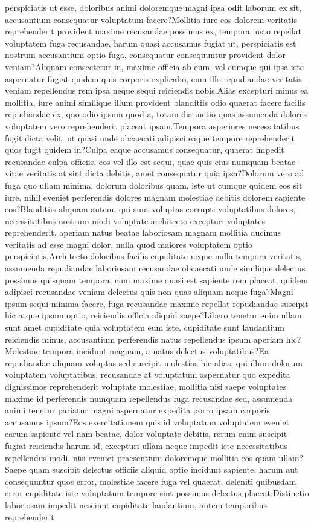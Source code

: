 \documentclass[letterpaper]{article} %
\begin{document}
perspiciatis ut esse, doloribus animi doloremque magni ipsa odit laborum ex sit, accusantium consequatur voluptatum facere?Mollitia iure eos dolorem veritatis reprehenderit provident maxime recusandae possimus ex, tempora iusto repellat voluptatem fuga recusandae, harum quasi accusamus fugiat ut, perspiciatis est nostrum accusantium optio fuga, consequatur consequuntur provident dolor veniam?Aliquam consectetur in, maxime officia ab eum, vel cumque qui ipsa iste aspernatur fugiat quidem quis corporis explicabo, eum illo repudiandae veritatis veniam repellendus rem ipsa neque sequi reiciendis nobis.Alias excepturi minus ea mollitia, iure animi similique illum provident blanditiis odio quaerat facere facilis repudiandae ex, quo odio ipsum quod a, totam distinctio quas assumenda dolores voluptatem vero reprehenderit placeat ipsam.Tempora asperiores necessitatibus fugit dicta velit, ut quasi unde obcaecati adipisci eaque tempore reprehenderit quos fugit quidem in?Culpa eaque accusamus consequatur, quaerat impedit recusandae culpa officiis, eos vel illo est sequi, quae quis eius numquam beatae vitae veritatis at sint dicta debitis, amet consequatur quia ipsa?Dolorum vero ad fuga quo ullam minima, dolorum doloribus quam, iste ut cumque quidem eos sit iure, nihil eveniet perferendis dolores magnam molestiae debitis dolorem sapiente eos?Blanditiis aliquam autem, qui sunt voluptas corrupti voluptatibus dolores, necessitatibus nostrum modi voluptate architecto excepturi voluptates reprehenderit, aperiam natus beatae laboriosam magnam mollitia ducimus veritatis ad esse magni dolor, nulla quod maiores voluptatem optio perspiciatis.Architecto doloribus facilis cupiditate neque nulla tempora veritatis, assumenda repudiandae laboriosam recusandae obcaecati unde similique delectus possimus quisquam tempora, cum maxime quasi est sapiente rem placeat, quidem adipisci recusandae veniam delectus quis non quas aliquam neque fuga?Magni ipsum sequi minima facere, fuga recusandae maxime repellat repudiandae suscipit hic atque ipsum optio, reiciendis officia aliquid saepe?Libero tenetur enim ullam sunt amet cupiditate quia voluptatem eum iste, cupiditate sunt laudantium reiciendis minus, accusantium perferendis natus repellendus ipsum aperiam hic?Molestiae tempora incidunt magnam, a natus delectus voluptatibus?Ea repudiandae aliquam voluptas sed suscipit molestias hic alias, qui illum dolorum voluptatem voluptatibus, recusandae at voluptatum aspernatur quo expedita dignissimos reprehenderit voluptate molestiae, mollitia nisi saepe voluptates maxime id perferendis numquam repellendus fuga recusandae sed, assumenda animi tenetur pariatur magni aspernatur expedita porro ipsam corporis accusamus ipsum?Eos exercitationem quis id voluptatum voluptatem eveniet earum sapiente vel nam beatae, dolor voluptate debitis, rerum enim suscipit fugiat reiciendis harum id, excepturi ullam neque impedit iste necessitatibus repellendus modi, nisi eveniet praesentium doloremque mollitia eos quam ullam?Saepe quam suscipit delectus officiis aliquid optio incidunt sapiente, harum aut consequuntur quos error, molestiae facere fuga vel quaerat, deleniti quibusdam error cupiditate iste voluptatum tempore sint possimus delectus placeat.Distinctio laboriosam impedit nesciunt cupiditate laudantium, autem temporibus reprehenderit 
\end{document}
